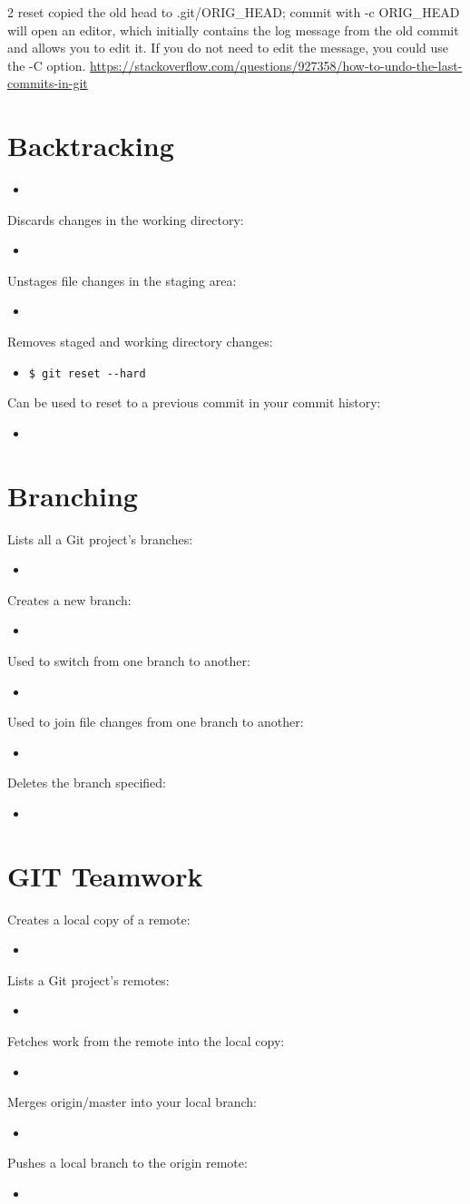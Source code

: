 \documentclass[a4paper, twocolumn]{article}
\newcommand{\insertshellcode}[2]{\begin{itemize}\item[]\end{itemize}} %
\begin{document}
2 reset copied the old head to .git/ORIG\_HEAD; commit with -c ORIG\_HEAD will open an editor, which initially contains the log message from the old commit and allows you to edit it. If you do not need to edit the message, you could use the -C option.
\url{https://stackoverflow.com/questions/927358/how-to-undo-the-last-commits-in-git}

\section{Backtracking}
\insertshellcode{Scripts/backtracking/git_show_HEAD.txt}{}
%
Discards changes in the working directory:
\insertshellcode{Scripts/backtracking/git_checkout_HEAD_filename.txt}{}
%
Unstages file changes in the staging area:
\insertshellcode{Scripts/backtracking/git_reset_HEAD_filename.txt}{}
%
Removes staged and working directory changes:
\begin{itemize}
\item[]
\begin{lstlisting}[style=Style2]
$ git reset --hard
\end{lstlisting}
\end{itemize}

%
Can be used to reset to a previous commit in your commit history:
\insertshellcode{Scripts/backtracking/git_reset_SHA.txt}{}

\section{Branching}

Lists all a Git project's branches:
\insertshellcode{Scripts/branch/git_branch.txt}{}
%
Creates a new branch:
\insertshellcode{Scripts/branch/git_branch_branchname.txt}{}
%
Used to switch from one branch to another:
\insertshellcode{Scripts/branch/git_checkout_branchname.txt}{}
%
Used to join file changes from one branch to another:
\insertshellcode{Scripts/branch/git_merge_branchname.txt}{}
%
Deletes the branch specified:
\insertshellcode{Scripts/branch/git_branch_-d_branchname.txt}{}

\section{GIT Teamwork}
Creates a local copy of a remote:
\insertshellcode{Scripts/teamwork/git_clone_remote_location_clone_name.txt}{}
%
Lists a Git project's remotes:
\insertshellcode{Scripts/teamwork/git_remote_-v.txt}{}
%
Fetches work from the remote into the local copy:
\insertshellcode{Scripts/teamwork/git_fetch.txt}{}
%
Merges origin/master into your local branch:
\insertshellcode{Scripts/teamwork/git_merge_origin_master.txt}{}
%
Pushes a local branch to the origin remote:
\insertshellcode{Scripts/teamwork/git_push_origin_branch_name.txt}{}
\end{document}
